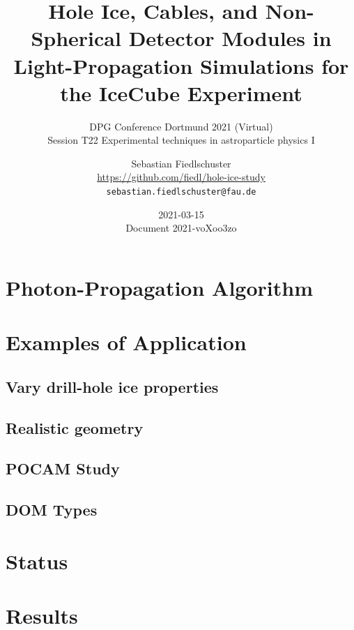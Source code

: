 \documentclass[green, 12pt]{beamer}
\title[Hole Ice, Cables, and Non-Spherical Detector Modules in Light-Propagation Simulations]{Hole Ice, Cables, and Non-Spherical Detector Modules in Light-Propagation Simulations for the IceCube Experiment}
\subtitle{DPG Conference Dortmund 2021 (Virtual)\\ Session T22 Experimental techniques in astroparticle physics I}
\date{2021-03-15 \\ \vspace*{2mm}\tiny{Document 2021-voXoo3zo} \normalsize}
\author[Sebastian Fiedlschuster, ECAP Erlangen, 2021-03-15]{Sebastian Fiedlschuster \\ \tiny{\url{https://github.com/fiedl/hole-ice-study}} \\ \tiny\texttt{sebastian.fiedlschuster@fau.de}}
\institute{Erlangen Centre for Astroparticle Physics}
\newif\ifplacelogo %
\begin{document}



\placelogofalse

  
  
  
%  

\section{Photon-Propagation Algorithm}
  

\section{Examples of Application}
\subsection{Vary drill-hole ice properties}
  
\subsection{Realistic geometry}
  
\subsection{POCAM Study}
  
%  
%  
\subsection{DOM Types}
  

\section{Status}
  
\section{Results}
  
\end{document}
